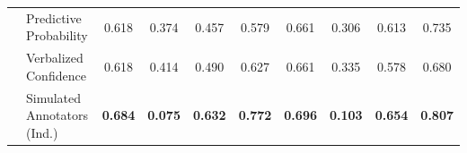\begin{table}[t]
{\begin{tabular}{clcccccccc}
        \midrule
         & Predictive Probability & 0.618 & 0.374 & 0.457 & 0.579 & 0.661 & 0.306 & 0.613 & 0.735 \\
                                      & Verbalized Confidence & 0.618 & 0.414 & 0.490 & 0.627 & 0.661 & 0.335 & 0.578 & 0.680 \\
                                      & Simulated Annotators (Ind.) & \textbf{0.684} & \textbf{0.075} & \textbf{0.632} & \textbf{0.772} & \textbf{0.696} & \textbf{0.103} & \textbf{0.654} & \textbf{0.807} \\
         \bottomrule
    \end{tabular}
}
\vspace{-6pt}
\label{tab:simulated_annotators_main}
\end{table}